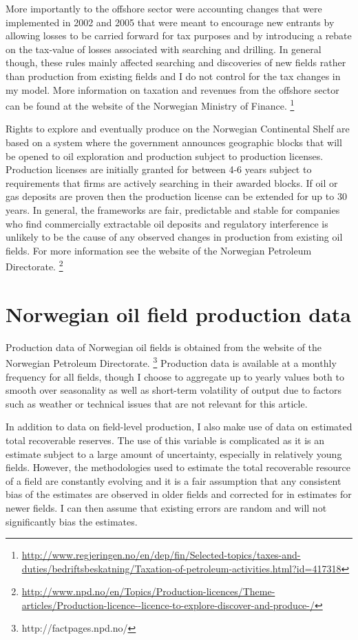 \documentclass[11pt]{article}
\begin{document}
More importantly to the offshore sector were accounting changes that were implemented in 2002 and 2005 that were meant to encourage new entrants by allowing losses to be carried forward for tax purposes and by introducing a rebate on the tax-value of losses associated with searching and drilling.  In general though, these rules mainly affected searching and discoveries of new fields rather than production from existing fields and I do not control for the tax changes in my model.  More information on taxation and revenues from the offshore sector can be found at the website of the Norwegian Ministry of Finance. \footnote{\url{http://www.regjeringen.no/en/dep/fin/Selected-topics/taxes-and-duties/bedriftsbeskatning/Taxation-of-petroleum-activities.html?id=417318}}

Rights to explore and eventually produce on the Norwegian Continental Shelf are based on a system where the government announces geographic blocks that will be opened to oil exploration and production subject to production licenses.  Production licenses are initially granted for between 4-6 years subject to requirements that firms are actively searching in their awarded blocks.  If oil or gas deposits are proven then the production license can be extended for up to 30 years.  In general, the frameworks are fair, predictable and stable for companies who find commercially extractable oil deposits and regulatory interference is unlikely to be the cause of any observed changes in production from existing oil fields.  For more information see the website of the Norwegian Petroleum Directorate. \footnote{\url{http://www.npd.no/en/Topics/Production-licences/Theme-articles/Production-licence--licence-to-explore-discover-and-produce-/}}

\section{Norwegian oil field production data}
Production data of Norwegian oil fields is obtained from the website of the Norwegian Petroleum Directorate. \footnote{http://factpages.npd.no/}  Production data is available at a monthly frequency for all fields, though I choose to aggregate up to yearly values both to smooth over seasonality as well as short-term volatility of output due to factors such as weather or technical issues that are not relevant for this article.  

In addition to data on field-level production, I also make use of data on estimated total recoverable reserves. The use of this variable is complicated as it is an estimate subject to a large amount of uncertainty, especially in relatively young fields.  However, the methodologies used to estimate the total recoverable resource of a field are constantly evolving and it is a fair assumption that any consistent bias of the estimates are observed in older fields and corrected for in estimates for newer fields.  I can then assume that existing errors are random and will not significantly bias the estimates.  
\end{document}
